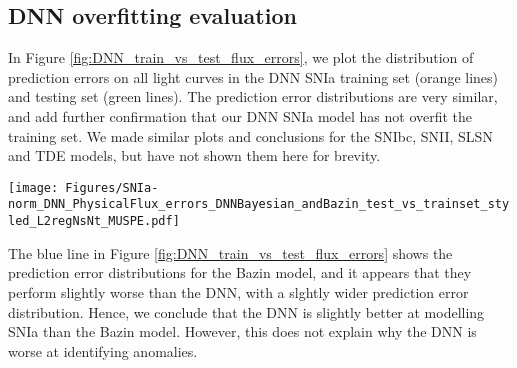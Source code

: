 \documentclass[fleqn,usenatbib]{mnras}
\begin{document}
    \subsection{DNN overfitting evaluation}
        In Figure \ref{fig:DNN_train_vs_test_flux_errors}, we plot the distribution of prediction errors on all light curves in the DNN SNIa training set (orange lines) and testing set (green lines). The prediction error distributions are very similar, and add further confirmation that our DNN SNIa model has not overfit the training set. We made similar plots and conclusions for the SNIbc, SNII, SLSN and TDE models, but have not shown them here for brevity.
        \begin{figure*}
        \centering
        \texttt{[image: Figures/SNIa-norm\_DNN\_PhysicalFlux\_errors\_DNNBayesian\_andBazin\_test\_vs\_trainset\_styled\_L2regNsNt\_MUSPE.pdf]}
        \caption[Distribution of the Measurement-Uncertainty-Scaled Prediction Errors (MUSPE) for the SNIa model at different times.]{Distribution of the Measurement-Uncertainty-Scaled Prediction Errors (MUSPE) for the SNIa model at different times. Equation \ref{eq:physical_flux_error} is computed at each time-step for all SNIa in DNN training set (orange lines), testing sets (green lines) and for the Bazin training set (blue dotted line). We show the mean, and root mean square (rms) for each prediction error distribution at each time-step in the first three panels, with the $g$ band shown in the top row of panels, and the $r$ band shown in the bottom row of panels. In the last column, we plot the distribution of scaled errors across all times. Similar plots were made for the SNIbc, SNII, SLSN and TDE models, but are not shown here for brevity. We plot a unit Gaussian as a black dashed line to help guide the eye. The plots were made using the simulated dataset.}
        \label{fig:DNN_train_vs_test_flux_errors}
        \end{figure*}
        
        The blue line in Figure \ref{fig:DNN_train_vs_test_flux_errors} shows the prediction error distributions for the Bazin model, and it appears that they perform slightly worse than the DNN, with a slghtly wider prediction error distribution. Hence, we conclude that the DNN is slightly better at modelling SNIa than the Bazin model. However, this does not explain why the DNN is worse at identifying anomalies.
    
\end{document}
